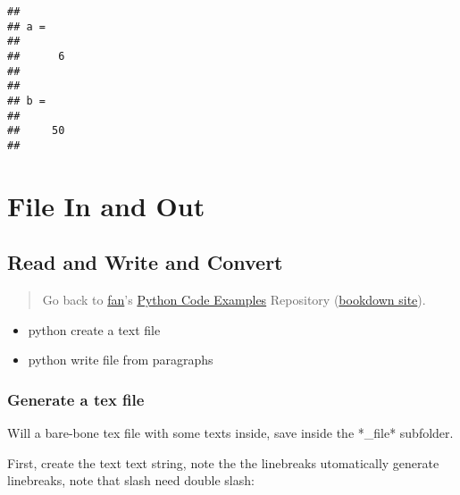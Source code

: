 \documentclass[
]{book}
\providecommand{\tightlist}{%
  \setlength{\itemsep}{0pt}\setlength{\parskip}{0pt}}
\begin{document}
\begin{verbatim}
## 
## a =
## 
##      6
## 
## 
## b =
## 
##     50
## 
\end{verbatim}

\hypertarget{file-in-and-out}{%
\section{File In and Out}\label{file-in-and-out}}

\hypertarget{read-and-write-and-convert}{%
\subsection{Read and Write and Convert}\label{read-and-write-and-convert}}

\begin{quote}
Go back to \href{http://fanwangecon.github.io/}{fan}'s \href{https://fanwangecon.github.io/pyfan/}{Python Code Examples} Repository (\href{https://fanwangecon.github.io/pyfan/bookdown}{bookdown site}).
\end{quote}

\begin{itemize}
\tightlist
\item
  python create a text file
\item
  python write file from paragraphs
\end{itemize}

\hypertarget{generate-a-tex-file}{%
\subsubsection{Generate a tex file}\label{generate-a-tex-file}}

Will a bare-bone tex file with some texts inside, save inside the *\_file* subfolder.

First, create the text text string, note the the linebreaks utomatically generate linebreaks, note that slash need double slash:
\end{document}
